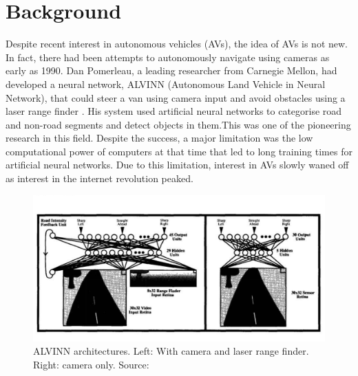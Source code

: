 \let\textcircled=\pgftextcircled


\chapter{Background}
\label{chap:background}

Despite recent interest in autonomous vehicles (AVs), the idea of AVs is not new. In fact, there had been attempts to autonomously navigate using cameras as early as 1990. Dan Pomerleau, a leading researcher from Carnegie Mellon, had developed a neural network, ALVINN (Autonomous Land Vehicle in Neural Network)\cite{pomerleau1989alvinn},  that could steer a van using camera input and avoid obstacles using a laser range finder . His system used artificial neural networks to categorise road and non-road segments and detect objects in them\cite{pomerleau1991rapidly}.This was one of the pioneering research in this field. Despite the success, a major limitation was the low computational power of computers at that time that led to long training times for artificial neural networks. Due to this limitation, interest in AVs slowly waned off as interest in the internet revolution peaked. 

 \begin{figure}[h]
	\centering
	\includegraphics[width=\textwidth]{images/alvinn.png}
	\caption{ALVINN architectures. Left: With camera and laser range finder. Right: camera only. Source: \cite{pomerleau1991rapidly}}
	\label{fig:alvinn}
\end{figure}

